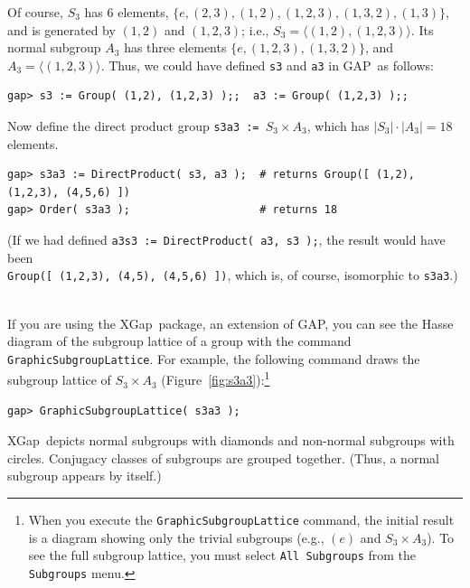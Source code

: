\documentclass[11pt]{amsart}
\newcommand{\gap}{GAP}   %
\newcommand{\xgap}{XGap}   %
\theoremstyle{plain}
\newcommand{\codesize}{\footnotesize}
\newcommand{\<}{\ensuremath{\langle}}
\renewcommand{\>}{\ensuremath{\rangle}}
\begin{document}
\begin{enumerate}
{\begin{verbatim}
\end{verbatim}}
\noindent Of course, $S_3$ has 6 elements, 
$\{ e, (2,3), (1,2), (1,2,3), (1,3,2), (1,3) \}$, 
and is generated by $(1,2)$ and $(1,2,3)$; i.e., $S_3 = \langle (1,2),
(1,2,3)\rangle$.
Its normal subgroup $A_3$ has three elements $\{ e, (1,2,3), (1,3,2)\}$, and
$A_3 = \<(1,2,3)\>$.   Thus, we could have defined {\tt s3} and 
{\tt a3} in \gap\ as follows:
{\codesize
\begin{verbatim}
gap> s3 := Group( (1,2), (1,2,3) );;  a3 := Group( (1,2,3) );;

\end{verbatim}}
\noindent Now define the direct product group {\tt s3a3 := $S_3 \times A_3$}, which has 
$|S_3|\cdot |A_3| = 18$ elements.
{\codesize
\begin{verbatim}
gap> s3a3 := DirectProduct( s3, a3 );  # returns Group([ (1,2), (1,2,3), (4,5,6) ])
gap> Order( s3a3 );                    # returns 18
\end{verbatim}
\noindent (If we had defined {\tt a3s3 := DirectProduct( a3, s3 );}, the result
would have been \\
{\tt Group([ (1,2,3), (4,5), (4,5,6) ])}, which is, of course, isomorphic to
{\tt s3a3}.)}
\\[5pt]
\noindent If you are using the \xgap\ package, an extension of \gap, you can see the
Hasse diagram of the subgroup lattice of a group with the command 
{\tt GraphicSubgroupLattice}.
For example, the following command draws the subgroup lattice of $S_3 \times A_3$
(Figure~\ref{fig:s3a3}):\footnote{When you execute the 
{\tt GraphicSubgroupLattice} command, the initial result is a
diagram showing only the trivial subgroups (e.g., $(e)$ and $S_3\times A_3$).  
To see the full subgroup lattice, you must select {\tt All Subgroups} from the 
{\tt Subgroups} menu.} 
{\codesize
\begin{verbatim}
gap> GraphicSubgroupLattice( s3a3 );

\end{verbatim}}
\noindent \xgap\ depicts normal subgroups with diamonds and non-normal subgroups with circles.  
Conjugacy classes of subgroups are grouped together.
(Thus, a normal subgroup appears by itself.)


\end{enumerate}
\end{document}
